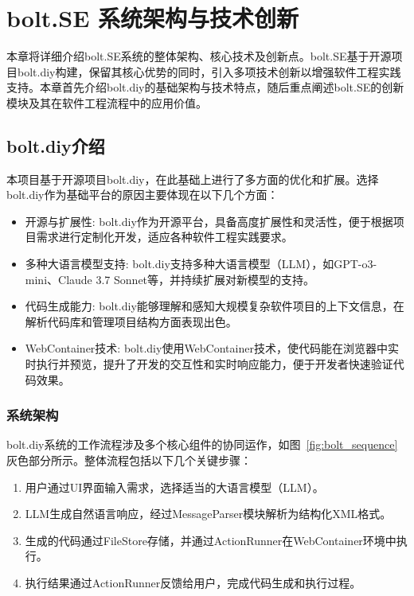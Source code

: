\chapter{bolt.SE 系统架构与技术创新}
\label{chap:code-generation}

本章将详细介绍bolt.SE系统的整体架构、核心技术及创新点。bolt.SE基于开源项目bolt.diy构建，保留其核心优势的同时，引入多项技术创新以增强软件工程实践支持。本章首先介绍bolt.diy的基础架构与技术特点，随后重点阐述bolt.SE的创新模块及其在软件工程流程中的应用价值。

\section{bolt.diy介绍}

本项目基于开源项目bolt.diy，在此基础上进行了多方面的优化和扩展。选择bolt.diy作为基础平台的原因主要体现在以下几个方面：

\begin{itemize}
    \item 开源与扩展性: bolt.diy作为开源平台，具备高度扩展性和灵活性，便于根据项目需求进行定制化开发，适应各种软件工程实践要求。
    \item 多种大语言模型支持: bolt.diy支持多种大语言模型（LLM），如GPT-o3-mini、Claude 3.7 Sonnet等，并持续扩展对新模型的支持。
    \item 代码生成能力: bolt.diy能够理解和感知大规模复杂软件项目的上下文信息，在解析代码库和管理项目结构方面表现出色。
    \item WebContainer技术: bolt.diy使用WebContainer技术，使代码能在浏览器中实时执行并预览，提升了开发的交互性和实时响应能力，便于开发者快速验证代码效果。
\end{itemize}

\subsection{系统架构}

bolt.diy系统的工作流程涉及多个核心组件的协同运作，如图~\ref{fig:bolt_sequence}灰色部分所示。整体流程包括以下几个关键步骤：
\begin{enumerate}
    \item 用户通过UI界面输入需求，选择适当的大语言模型（LLM）。
    \item LLM生成自然语言响应，经过MessageParser模块解析为结构化XML格式。
    \item 生成的代码通过FileStore存储，并通过ActionRunner在WebContainer环境中执行。
    \item 执行结果通过ActionRunner反馈给用户，完成代码生成和执行过程。
\end{enumerate}

